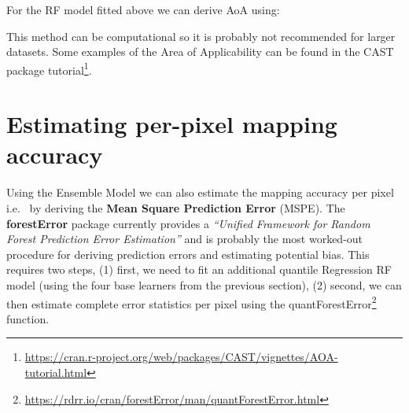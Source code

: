 \documentclass[
  graybox,natbib,nospthms]{svmono}
\newenvironment{Shaded}{\begin{snugshade}}{\end{snugshade}}
\newcommand{\AttributeTok}[1]{\textcolor[rgb]{0.61,0.61,0.61}{#1}}
\newcommand{\DecValTok}[1]{\textcolor[rgb]{0.06,0.06,0.06}{#1}}
\newcommand{\FunctionTok}[1]{\textcolor[rgb]{0,0,0}{#1}}
\newcommand{\NormalTok}[1]{#1}
\newcommand{\OtherTok}[1]{\textcolor[rgb]{0.37,0.37,0.37}{#1}}
\newcommand{\SpecialCharTok}[1]{\textcolor[rgb]{0,0,0}{#1}}
\renewcommand{\href}[2]{#2 (\url{#1})}
\renewcommand{\href}[2]{#2\footnote{\url{#1}}}
\begin{document}
For the RF model fitted above we can derive AoA using:

\begin{Shaded}
\end{Shaded}

This method can be computational so it is probably not recommended for larger datasets.
Some examples of the Area of Applicability can be found in the \href{https://cran.r-project.org/web/packages/CAST/vignettes/AOA-tutorial.html}{CAST package tutorial}.

\hypertarget{estimating-per-pixel-mapping-accuracy}{%
\section{Estimating per-pixel mapping accuracy}\label{estimating-per-pixel-mapping-accuracy}}

Using the Ensemble Model we can also estimate the mapping accuracy per pixel i.e.~
by deriving the \textbf{Mean Square Prediction Error} (MSPE). The \textbf{forestError} package currently
provides a \emph{``Unified Framework for Random Forest Prediction Error Estimation''} \citep{lu2021unified}
and is probably the most worked-out procedure for deriving prediction errors
and estimating potential bias. This requires two steps, (1) first, we need to
fit an additional quantile Regression RF model (using the four base learners from the
previous section), (2) second, we can then estimate complete error statistics
per pixel using the \href{https://rdrr.io/cran/forestError/man/quantForestError.html}{quantForestError} function.
\end{document}
